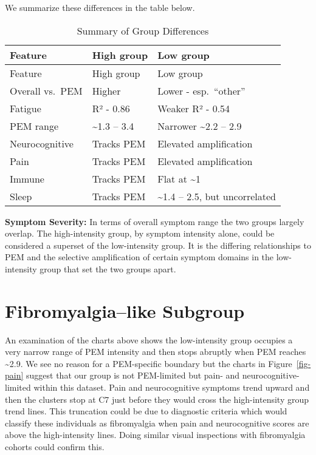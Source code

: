 \documentclass[
  letterpaper,
  DIV=11,
  numbers=noendperiod]{scrartcl}
\begin{document}
We summarize these differences in the table below.\bigskip

\begin{longtable}[]{@{}lll@{}}
\caption{Summary of Group Differences}\label{tbl-t1}\tabularnewline
\toprule\noalign{}
Feature & High group & Low group \\
\midrule\noalign{}
\endfirsthead
\toprule\noalign{}
Feature & High group & Low group \\
\midrule\noalign{}
\endhead
\bottomrule\noalign{}
\endlastfoot
Overall vs.~PEM & Higher & Lower - esp.~``other'' \\
Fatigue & R² - 0.86 & Weaker R² - 0.54 \\
PEM range & \textasciitilde1.3 -- 3.4 & Narrower \textasciitilde2.2 --
2.9 \\
Neurocognitive & Tracks PEM & Elevated amplification \\
Pain & Tracks PEM & Elevated amplification \\
Immune & Tracks PEM & Flat at \textasciitilde1 \\
Sleep & Tracks PEM & \textasciitilde1.4 -- 2.5, but uncorrelated \\
\end{longtable}

\bigskip

\textbf{Symptom Severity:} In terms of overall symptom range the two
groups largely overlap. The high-intensity group, by symptom intensity
alone, could be considered a superset of the low-intensity group. It is
the differing relationships to PEM and the selective amplification of
certain symptom domains in the low-intensity group that set the two
groups apart.

\section{Fibromyalgia--like Subgroup}\label{sec-fibro}

An examination of the charts above shows the low-intensity group
occupies a very narrow range of PEM intensity and then stops abruptly
when PEM reaches \textasciitilde2.9. We see no reason for a PEM-specific
boundary but the charts in Figure~\ref{fig-pain} suggest that our group
is not PEM-limited but pain- and neurocognitive-limited within this
dataset. Pain and neurocognitive symptoms trend upward and then the
clusters stop at C7 just before they would cross the high-intensity
group trend lines. This truncation could be due to diagnostic criteria
which would classify these individuals as fibromyalgia when pain and
neurocognitive scores are above the high-intensity lines. Doing similar
visual inspections with fibromyalgia cohorts could confirm this.
\end{document}
